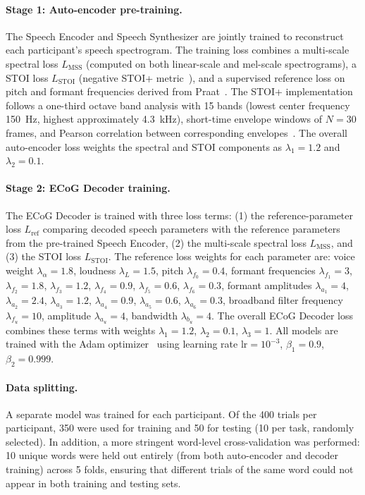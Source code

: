 \documentclass[10pt]{article}
\begin{document}
\paragraph{Stage 1: Auto-encoder pre-training.}
The Speech Encoder and Speech Synthesizer are jointly trained to reconstruct each participant's speech spectrogram. The training loss combines a multi-scale spectral loss $L_{\mathrm{MSS}}$ (computed on both linear-scale and mel-scale spectrograms), a STOI loss $L_{\mathrm{STOI}}$ (negative STOI+ metric~\cite{taal2011algorithm}), and a supervised reference loss on pitch and formant frequencies derived from Praat~\cite{boersma2001praat}. The STOI+ implementation follows a one-third octave band analysis with 15 bands (lowest center frequency 150~Hz, highest approximately 4.3~kHz), short-time envelope windows of $N=30$ frames, and Pearson correlation between corresponding envelopes~\cite{relanoiborra2016sepsm}. The overall auto-encoder loss weights the spectral and STOI components as $\lambda_1=1.2$ and $\lambda_2=0.1$.

\paragraph{Stage 2: ECoG Decoder training.}
The ECoG Decoder is trained with three loss terms: (1) the reference-parameter loss $L_{\mathrm{ref}}$ comparing decoded speech parameters with the reference parameters from the pre-trained Speech Encoder, (2) the multi-scale spectral loss $L_{\mathrm{MSS}}$, and (3) the STOI loss $L_{\mathrm{STOI}}$. The reference loss weights for each parameter are: voice weight $\lambda_\alpha=1.8$, loudness $\lambda_L=1.5$, pitch $\lambda_{f_0}=0.4$, formant frequencies $\lambda_{f_1}=3$, $\lambda_{f_2}=1.8$, $\lambda_{f_3}=1.2$, $\lambda_{f_4}=0.9$, $\lambda_{f_5}=0.6$, $\lambda_{f_6}=0.3$, formant amplitudes $\lambda_{a_1}=4$, $\lambda_{a_2}=2.4$, $\lambda_{a_3}=1.2$, $\lambda_{a_4}=0.9$, $\lambda_{a_5}=0.6$, $\lambda_{a_6}=0.3$, broadband filter frequency $\lambda_{f_u}=10$, amplitude $\lambda_{a_u}=4$, bandwidth $\lambda_{b_u}=4$. The overall ECoG Decoder loss combines these terms with weights $\lambda_1=1.2$, $\lambda_2=0.1$, $\lambda_3=1$. All models are trained with the Adam optimizer~\cite{kingma2015adam} using learning rate $\mathrm{lr}=10^{-3}$, $\beta_1=0.9$, $\beta_2=0.999$.

\paragraph{Data splitting.}
A separate model was trained for each participant. Of the 400 trials per participant, 350 were used for training and 50 for testing (10 per task, randomly selected). In addition, a more stringent word-level cross-validation was performed: 10 unique words were held out entirely (from both auto-encoder and decoder training) across 5 folds, ensuring that different trials of the same word could not appear in both training and testing sets.
\end{document}
